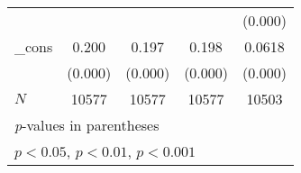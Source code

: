 {\begin{tabular}{l*{4}{c}}
            &                     &                     &                     &     (0.000)         \\
[1em]
\_cons      &       0.200\sym{***}&       0.197\sym{***}&       0.198\sym{***}&      0.0618\sym{***}\\
            &     (0.000)         &     (0.000)         &     (0.000)         &     (0.000)         \\
\hline
\(N\)       &       10577         &       10577         &       10577         &       10503         \\
\hline\hline
\multicolumn{5}{l}{\footnotesize \textit{p}-values in parentheses}\\
\multicolumn{5}{l}{\footnotesize \sym{*} \(p<0.05\), \sym{**} \(p<0.01\), \sym{***} \(p<0.001\)}\\
\end{tabular}
}

